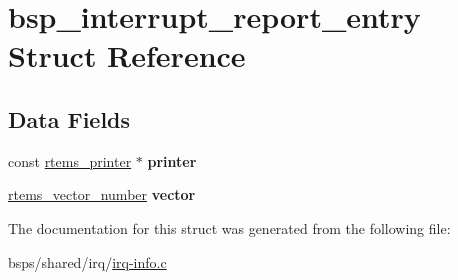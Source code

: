 \hypertarget{structbsp__interrupt__report__entry}{}\section{bsp\+\_\+interrupt\+\_\+report\+\_\+entry Struct Reference}
\label{structbsp__interrupt__report__entry}
\subsection*{Data Fields}
\begin{DoxyCompactItemize}
\item 
\mbox{\label{structbsp__interrupt__report__entry_a6bc274ce46411790c2861d57e0ec9e95}} 
const \mbox{\hyperlink{structrtems__printer}{rtems\+\_\+printer}} $\ast$ {\bfseries printer}
\item 
\mbox{\label{structbsp__interrupt__report__entry_a934c612a7b942e105bcbc3502d22c68d}} 
\mbox{\hyperlink{group__ClassicINTR_ga3e434c197d99f128e78cae4d9358bd8b}{rtems\+\_\+vector\+\_\+number}} {\bfseries vector}
\end{DoxyCompactItemize}


The documentation for this struct was generated from the following file\+:\begin{DoxyCompactItemize}
\item 
bsps/shared/irq/\mbox{\hyperlink{irq-info_8c}{irq-\/info.\+c}}\end{DoxyCompactItemize}
